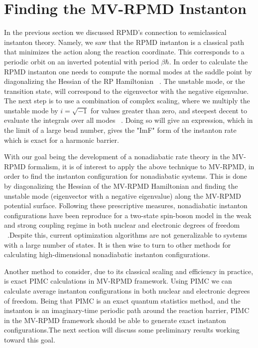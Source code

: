 \documentclass[phd,tocprelim]{cornell}
\begin{document}
   
  
  
  
 \section{Finding the MV-RPMD Instanton}
In the previous section we discussed RPMD's connection to semiclassical instanton theory. Namely, we saw that the RPMD instanton is 
a classical path that minimizes the action along the reaction coordinate. This corresponds to a periodic orbit on an inverted potential with period $\beta \hbar$. In order to calculate the RPMD instanton one needs to compute the normal modes at the saddle point by diagonalizing the Hessian of the RP Hamiltonian ~\cite{SCA2009,AFFLECK1981,CALLAN1977,IMFBOOK}. The unstable mode, or the transition state, will correspond to the eigenvector with the negative eigenvalue. The next step is to use a combination of complex scaling, where we multiply the unstable mode by $i=\sqrt{-1}$ for values greater than zero, and steepest decent to evaluate the integrals over all modes ~\cite{AFFLECK1981,CALLAN1977,IMFBOOK}. Doing so will give an expression, which in the limit of a large bead number, gives the "ImF" form of the instanton rate which is exact for a harmonic barrier. 

With our goal being the development of a nonadiabatic rate theory in the MV-RPMD formalism, it is of interest to apply the above technique to MV-RPMD, in order to find the instanton configuration for nonadiabatic systems. This is done by diagonalizing the Hessian of the MV-RPMD Hamiltonian and finding the unstable mode (eigenvector with a negative eigenvalue) along the MV-RPMD potential surface. Following these prescriptive measures, nonadiabatic instanton configurations have been reproduce for a two-state spin-boson model in the weak and strong coupling regime in both nuclear and electronic degrees of freedom ~\cite{SRINANTH18}.Despite this, current optimization algorithms are not generalizable to systems with a large number of states. It is then wise to turn to other methods for calculating high-dimensional nonadiabatic instanton configurations. 

Another method to consider, due to its classical scaling and efficiency in practice, is exact PIMC calculations in MV-RPMD framework. Using PIMC we can calculate average instanton configurations in both nuclear and electronic degrees of freedom. Being that PIMC is an exact quantum statistics method, and the instanton is an imaginary-time periodic path around the reaction barrier, PIMC in the MV-RPMD framework should be able to generate exact instanton configurations.The next section will discuss some preliminary results working toward this goal. 
\end{document}
